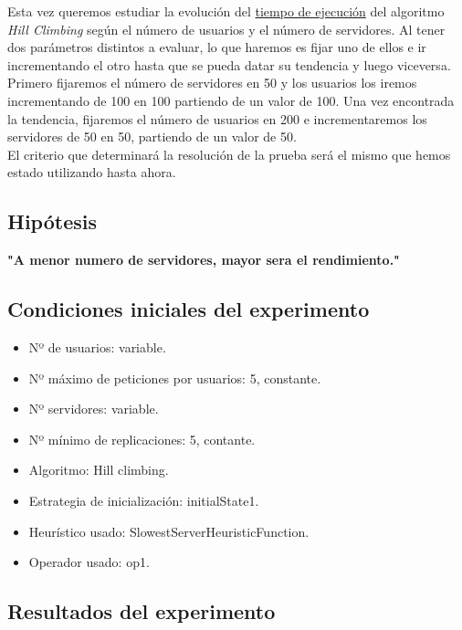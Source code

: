 \documentclass[a4paper,10pt]{report}
\begin{document}
		Esta vez queremos estudiar la evolución del \uline{tiempo de ejecución} del algoritmo \textit{Hill Climbing} según el número de usuarios y el número de servidores. Al tener dos parámetros distintos a evaluar, lo que haremos es fijar uno de ellos e ir incrementando el otro hasta que se pueda datar su tendencia y luego viceversa. \\
		Primero fijaremos el número de servidores en 50 y los usuarios los iremos incrementando de 100 en 100 partiendo de un valor de 100. Una vez encontrada la tendencia, fijaremos el número de usuarios en 200 e incrementaremos los servidores de 50 en 50, partiendo de un valor de 50.\\
		El criterio que determinará la resolución de la prueba será el mismo que hemos estado utilizando hasta ahora.
		
		\subsection*{Hipótesis}
		\textbf{"A menor numero de servidores, mayor sera el rendimiento."}
		
		\subsection*{Condiciones iniciales del experimento}
		\begin{itemize}
		    \item Nº de usuarios: variable.
    		\item Nº máximo de peticiones por usuarios: 5, constante.
    		\item Nº servidores: variable.
    		\item Nº mínimo de replicaciones: 5, contante.
    		\item Algoritmo: Hill climbing.
    		\item Estrategia de inicialización: initialState1.
    		\item Heurístico usado: SlowestServerHeuristicFunction.
    		\item Operador usado: op1.
		\end{itemize}

		\subsection*{Resultados del experimento}
		
\end{document}
